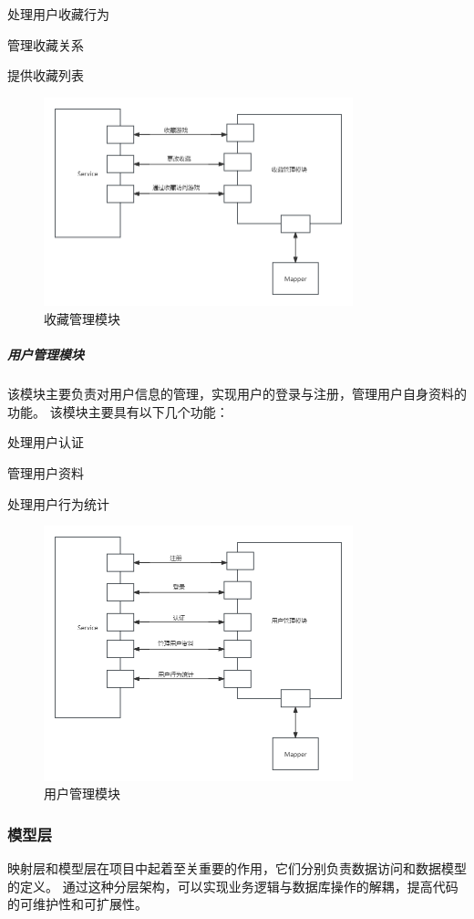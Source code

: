 \documentclass[12pt]{ctexart} %
\begin{document}
处理用户收藏行为

管理收藏关系

提供收藏列表

\begin{figure}[htbp]
  \centering 
  \includegraphics[width=0.8\textwidth]{collect.png}
  \caption{收藏管理模块}
\end{figure}

\subparagraph{用户管理模块}

该模块主要负责对用户信息的管理，实现用户的登录与注册，管理用户自身资料的功能。
该模块主要具有以下几个功能：

处理用户认证

管理用户资料

处理用户行为统计

\begin{figure}[htbp]
  \centering 
  \includegraphics[width=0.8\textwidth]{user.png}
  \caption{用户管理模块}
\end{figure}

\subsubsection{模型层}
映射层和模型层在项目中起着至关重要的作用，它们分别负责数据访问和数据模型的定义。
通过这种分层架构，可以实现业务逻辑与数据库操作的解耦，提高代码的可维护性和可扩展性。
\end{document}
